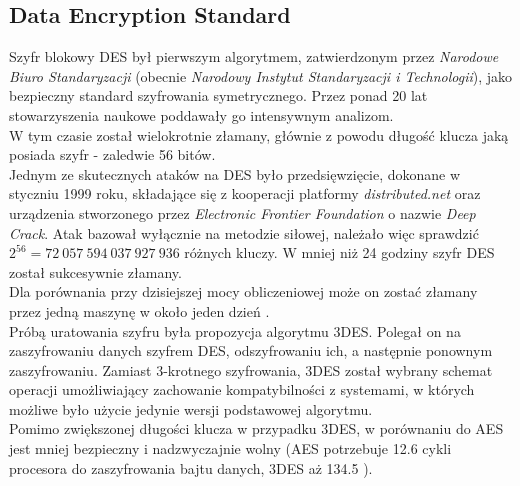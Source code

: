 \subsection{Data Encryption Standard}
Szyfr blokowy DES był pierwszym algorytmem, zatwierdzonym przez \textit{Narodowe Biuro Standaryzacji} 
(obecnie \textit{Narodowy Instytut Standaryzacji i Technologii}), jako bezpieczny standard szyfrowania symetrycznego.
Przez ponad 20 lat stowarzyszenia naukowe poddawały go intensywnym analizom. \\
W tym czasie został wielokrotnie złamany, głównie z powodu długość klucza jaką posiada szyfr - zaledwie 56 bitów. \\
Jednym ze skutecznych ataków na DES było przedsięwzięcie, dokonane w styczniu 1999 roku, składające się z kooperacji platformy \textit{distributed.net} 
oraz urządzenia stworzonego przez \textit{Electronic Frontier Foundation} o nazwie \textit{Deep Crack}. 
Atak bazował wyłącznie na metodzie siłowej, należało więc sprawdzić $2^{56} = 72\ 057\ 594\ 037\ 927\ 936$ różnych kluczy.
W mniej niż 24 godziny szyfr DES został sukcesywnie złamany. \\
Dla porównania przy dzisiejszej mocy obliczeniowej może on zostać złamany przez jedną maszynę w około jeden dzień \cite{desday}. \\
Próbą uratowania szyfru była propozycja algorytmu 3DES. 
Polegał on na zaszyfrowaniu danych szyfrem DES, odszyfrowaniu ich, a następnie ponownym zaszyfrowaniu. 
Zamiast 3-krotnego szyfrowania, 3DES został wybrany schemat operacji umożliwiający zachowanie kompatybilności z systemami, w których możliwe było użycie jedynie wersji podstawowej algorytmu. \\
Pomimo zwiększonej długości klucza w przypadku 3DES, w porównaniu do AES jest mniej bezpieczny i nadzwyczajnie wolny (AES potrzebuje 12.6 cykli procesora do zaszyfrowania bajtu danych, 3DES aż 134.5 \cite{crypto101}).

